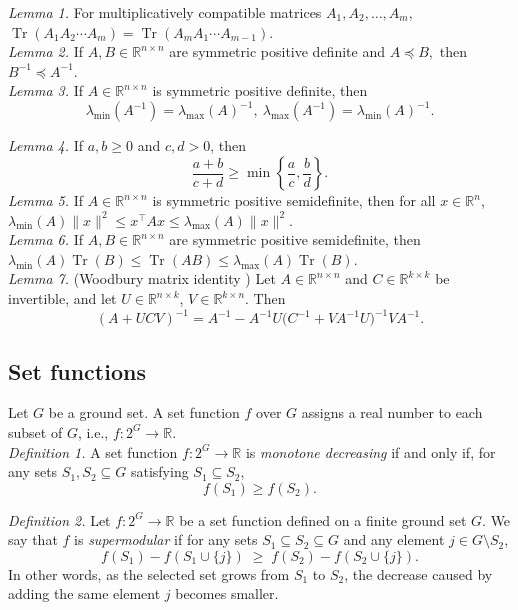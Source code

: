 \documentclass[letterpaper, 10 pt, conference]{ieeeconf}  %
\begin{document}
\noindent \textit{Lemma 1.}
For multiplicatively compatible matrices $A_1, A_2,\dots,A_m,$
$\operatorname{Tr}(A_1A_2\cdots A_m) = \operatorname{Tr}(A_mA_1\cdots A_{m-1}).$ \\

\noindent \textit{Lemma 2.}
If \(A,B \in \mathbb{R}^{n\times n}\) are symmetric positive definite and $A \preceq B,$
then $B^{-1} \preceq A^{-1}.$ \\

\noindent \textit{Lemma 3.}
If \(A \in \mathbb{R}^{n\times n}\) is symmetric positive definite, then
\[\lambda_{\min}(A^{-1})=\lambda_{\max}(A)^{-1},
\
\lambda_{\max}(A^{-1})=\lambda_{\min}(A)^{-1}.\]

\noindent \textit{Lemma 4.}
If \(a,b \ge 0\) and \(c,d > 0\), then
\[
\frac{a+b}{c+d}
\ge
\min\left\{\frac{a}{c},\frac{b}{d}\right\}.
\]
\noindent \textit{Lemma 5.}
If \(A \in \mathbb{R}^{n\times n}\) is symmetric positive semidefinite, then for all \(x \in \mathbb{R}^n\), $\lambda_{\min}(A)\|x\|^2
\le
x^\top A x
\le
\lambda_{\max}(A)\|x\|^2.$ \\

\noindent \textit{Lemma 6.}
If \(A,B \in \mathbb{R}^{n\times n}\) are symmetric positive semidefinite, then $\lambda_{\min}(A)\operatorname{Tr}(B)
\le
\operatorname{Tr}(AB)
\le
\lambda_{\max}(A)\operatorname{Tr}(B).$ \\

\noindent \textit{Lemma 7.} (Woodbury matrix identity \cite{c25})
Let \(A \in \mathbb{R}^{n\times n}\) and \(C \in \mathbb{R}^{k\times k}\) be invertible, and let
\(U \in \mathbb{R}^{n\times k}\), \(V \in \mathbb{R}^{k\times n}\). Then
\[
(A+UCV)^{-1}
=
A^{-1}
-
A^{-1}U\bigl(C^{-1}+VA^{-1}U\bigr)^{-1}VA^{-1}.
\]

\subsection{Set functions}

Let $G$ be a ground set. A set function $f$ over $G$ assigns a real number to each subset of $G$, i.e., $f: 2^{G} \rightarrow \mathbb{R}$. \\

\noindent \textit{Definition 1.} A set function \(f:2^{G}\to\mathbb{R}\) is \emph{monotone decreasing} if and only if, for any sets \(S_1,S_2\subseteq G\) satisfying \(S_1\subseteq S_2\),
\[
f(S_1)\ge f(S_2).
\]

\noindent \textit{Definition 2.} 
Let \(f:2^G\to\mathbb R\) be a set function defined on a finite ground set \(G\).  
We say that \(f\) is \emph{supermodular} if for any sets \(S_1 \subseteq S_2 \subseteq G\) and any element \(j \in G \setminus S_2\),
\[
f(S_1)-f(S_1\cup\{j\})
\;\ge\;
f(S_2)-f(S_2\cup\{j\}).
\]
In other words, as the selected set grows from \(S_1\) to \(S_2\), the decrease caused by adding the same element \(j\) becomes smaller. \\
\end{document}
